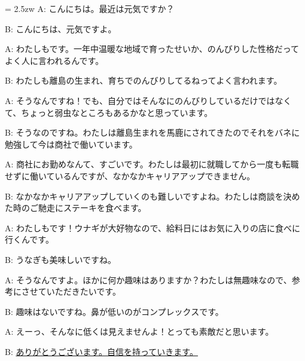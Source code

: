 \documentclass[11pt]{amsart}
\title{}
\author{}
\newenvironment{hangall}[1]{\hangindent = 2.5zw\everypar{\hangindent = 2.5zw}}{}
\begin{document}
\maketitle
\begin{hangall}{}%
A: こんにちは。最近は元気ですか？

B: こんにちは、元気ですよ。

A: わたしもです。一年中温暖な地域で育ったせいか、のんびりした性格だってよく人に言われるんです。

B: わたしも離島の生まれ、育ちでのんびりしてるねってよく言われます。

A: そうなんですね！でも、自分ではそんなにのんびりしているだけではなくて、ちょっと弱虫なところもあるかなと思っています。

B: そうなのですね。わたしは離島生まれを馬鹿にされてきたのでそれをバネに勉強して今は商社で働いています。

A: 商社にお勤めなんて、すごいです。わたしは最初に就職してから一度も転職せずに働いているんですが、なかなかキャリアアップできません。

B: なかなかキャリアアップしていくのも難しいですよね。わたしは商談を決めた時のご馳走にステーキを食べます。

A: わたしもです！ウナギが大好物なので、給料日にはお気に入りの店に食べに行くんです。

B: うなぎも美味しいですね。

A: そうなんですよ。ほかに何か趣味はありますか？わたしは無趣味なので、参考にさせていただきたいです。

B: 趣味はないですね。鼻が低いのがコンプレックスです。

A: えーっ、そんなに低くは見えませんよ！とっても素敵だと思います。

B: \ul{ありがとうございます。自信を持っていきます。}\end{hangall}
\end{document}
